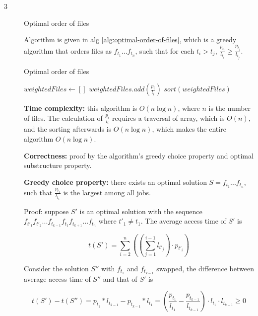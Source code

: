 \documentclass{article}
\begin{document}
\begin{description}
\item[3]{Optimal order of files}
  
  Algorithm is given in alg \ref{alg:optimal-order-of-files}, which is a greedy algorithm that orders files as $f_{t_1}...f_{t_n}$, such that for each $t_i > t_j$, $\frac{p_{t_i}}{l_{t_i}} \geq \frac{p_{t_j}}{l_{t_j}}$.

  \begin{algorithm}[h]
  \caption{Optimal order of files}
  \label{alg:optimal-order-of-files}
    \begin{algorithmic}[1]
  
      \State $weightedFiles \gets []$
        \State $weightedFiles.add(\frac{p_i}{l_i})$
      \EndFor
      \State \Return $sort(weightedFiles)$
    \EndFunction
    
    \end{algorithmic}
  \end{algorithm}

  \textbf{Time complexity:} this algorithm is $O(n \log n)$, where $n$ is the number of files. The calculation of $\frac{p_i}{l_i}$ requires a traversal of array, which is $O(n)$, and the sorting afterwards is $O(n \log n)$, which makes the entire algorithm $O(n \log n)$.

  \textbf{Correctness:} proof by the algorithm's greedy choice property and optimal substructure property.

  \textbf{Greedy choice property:} there exists an optimal solution $S=f_{t_1}...f_{t_n}$, such that $\frac{p_{t_1}}{l_{t_1}}$ is the largest among all jobs.

  Proof: suppose $S'$ is an optimal solution with the sequence $f_{t'_1}f_{t'_2}...f_{t_{k-1}}f_{t_1}f_{t_{k+1}}...f_{t_n}$ where $t'_1 \neq t_1$. The average access time of $S'$ is 

  $$t(S') = \sum_{i=2}^{n}{((\sum_{j=1}^{i-1}{l_{t'_j}}) \cdot p_{t'_i})}$$

  Consider the solution $S''$ with $f_{t_1}$ and $f_{t_{k-1}}$ swapped, the difference between average access time of $S''$ and that of $S'$ is

  $$t(S') - t(S'') = p_{t_{1}} * l_{t_{k-1}} - p_{t_{k-1}} * l_{t_1} = (\frac{p_{t_1}}{l_{t_1}} - \frac{p_{t_{k-1}}}{l_{t_{k-1}}}) \cdot l_{t_1} \cdot l_{t_{k-1}} \geq 0$$


\end{description}
\end{document}
